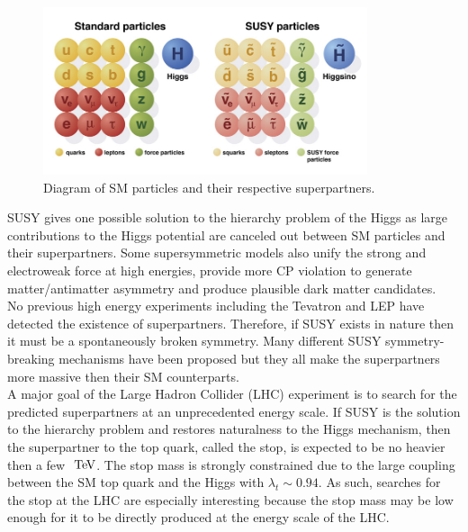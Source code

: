 \begin{figure}[h!]
\centering
    \includegraphics[width=0.85\textwidth]{figures/strategy/SUSYparticles.jpg}\hspace{0.05\textwidth}
\caption[Diagram of SM particles and their respective superpartners]{ Diagram of SM particles and their respective superpartners. }
\label{fig:SUSYpart}
\end{figure}

\indent SUSY gives one possible solution to the hierarchy problem of the Higgs as large contributions to the Higgs potential are canceled out between SM particles and their superpartners.  Some supersymmetric models also unify the strong and electroweak force at high energies, provide more CP violation to generate matter/antimatter asymmetry and produce plausible dark matter candidates. \\

\indent No previous high energy experiments including the Tevatron and LEP have detected the existence of superpartners.\cite{SUSYTevatron,SUSYLep}  Therefore, if SUSY exists in nature then it must be a spontaneously broken symmetry.  Many different SUSY symmetry-breaking mechanisms have been proposed but they all make the superpartners more massive then their SM counterparts. \\

\indent A major goal of the Large Hadron Collider (LHC) experiment is to search for the predicted superpartners at an unprecedented energy scale.  If SUSY is the solution to the hierarchy problem and restores naturalness to the Higgs mechanism, then the superpartner to the top quark, called the stop, is expected to be no heavier then a few $\tev$.  The stop mass is strongly constrained due to the large coupling between the SM top quark and the Higgs with $\lambda_t \sim 0.94$.  As such, searches for the stop at the LHC are especially interesting because the stop mass may be low enough for it to be directly produced at the energy scale of the LHC. \\

